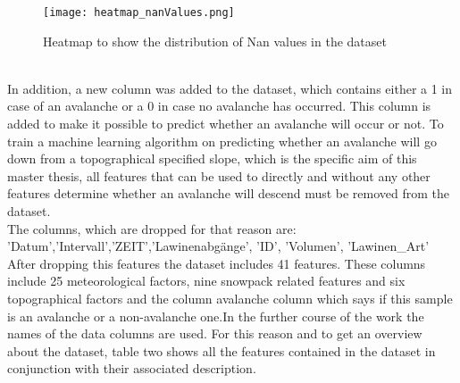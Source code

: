 \documentclass[../masterarbeit.tex]{subfiles}
\begin{document}
\begin{figure}[h]
    \centering
    \texttt{[image: heatmap\_nanValues.png]}
    \caption{Heatmap to show the distribution of Nan values in the dataset}
\end{figure}
\\
In addition, a new column was added to the dataset, which contains either a 1 in case of an avalanche or a 0 in case no avalanche has occurred. This column is added to make it possible to predict  whether an avalanche will occur or not. To train a machine learning algorithm on predicting whether an avalanche will go down from a topographical specified slope, which is the specific aim of this master thesis, all features that can be used to directly and without any other features determine whether an avalanche will descend must be removed from the dataset.\\
The columns, which are dropped for that reason are: \\
'Datum','Intervall','ZEIT','Lawinenabgänge', 'ID', 'Volumen', 'Lawinen\_Art'
After dropping this features the dataset includes 41 features. These columns include 25 meteorological factors, nine snowpack related features and six topographical factors and the column avalanche column which says if this sample is an avalanche or a non-avalanche one.In the further course of the work the names of the data columns are used. For this reason and to get an overview about the dataset, table two shows all the features contained in the dataset in conjunction with their associated description. 
\end{document}
